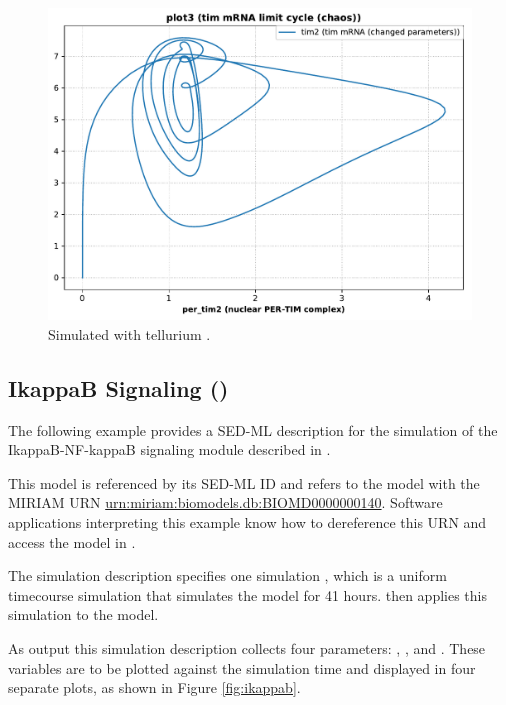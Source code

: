 \begin{figure}[ht]
\begin{minipage}{0.47\textwidth}
		\includegraphics[width=1.0\textwidth]{examples/leloup-sbml/results/tellurium/plot3}
        \caption{Simulated with tellurium \citep{tellurium}.}
    \end{minipage}
    \label{fig:leloup-sbml}
\end{figure}



\subsection{IkappaB Signaling ()}
The following example provides a SED-ML description for the simulation of the IkappaB-NF-kappaB signaling module described in \citep{hoffmann2002ikappab}.

This model is referenced by its SED-ML ID  and refers to the model with the MIRIAM URN \url{urn:miriam:biomodels.db:BIOMD0000000140}. 
Software applications interpreting this example know how to dereference this URN and access the model in \biom \citep{N+06}.

The simulation description specifies one simulation , which is a uniform timecourse simulation that simulates the model for 41 hours.  then applies this simulation to the model.

As output this simulation description collects four parameters: , ,  and . These variables are to be plotted against the simulation time and displayed in four separate plots, as shown in Figure \ref{fig:ikappab}.

